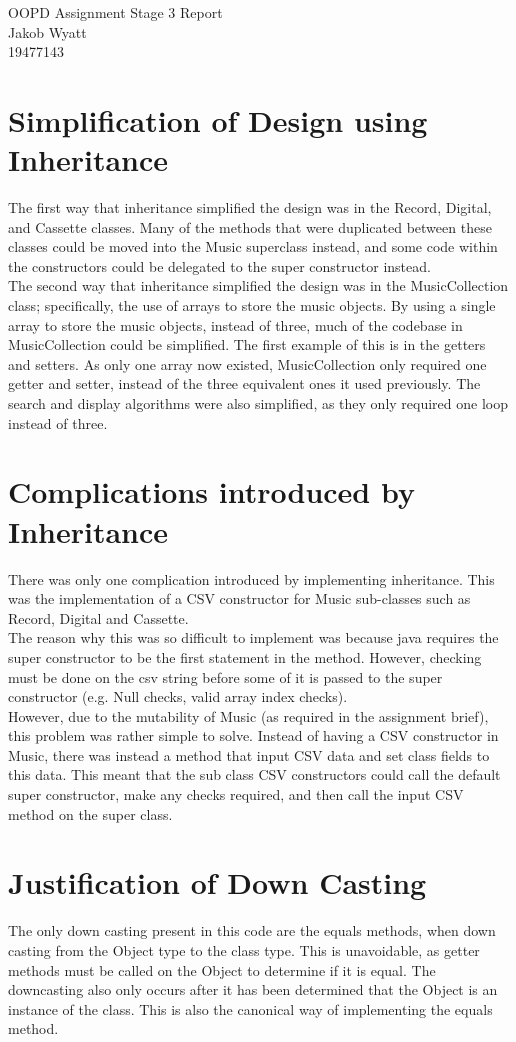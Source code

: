 \documentclass{article}
\begin{document}
\begin{center}
    \Huge
    OOPD Assignment Stage 3 Report\\
    \large
    Jakob Wyatt\\
    19477143
\end{center}

\section{Simplification of Design using Inheritance}
The first way that inheritance simplified the design was
in the Record, Digital, and Cassette classes. Many of the 
methods that were duplicated between these classes could be moved
into the Music superclass instead, and some code within the constructors
could be delegated to the super constructor instead.\\
The second way that inheritance simplified the design was in the 
MusicCollection class; specifically, the use of arrays to store the
music objects. By using a single array to store the music objects,
instead of three, much of the codebase in MusicCollection could be
simplified. The first example of this is in the getters and setters.
As only one array now existed, MusicCollection only required one 
getter and setter, instead of the three equivalent ones it used previously.
The search and display algorithms were also simplified, as they only required
one loop instead of three.

\section{Complications introduced by Inheritance}
There was only one complication introduced by implementing inheritance.
This was the implementation of a CSV constructor for Music sub-classes
such as Record, Digital and Cassette.\\
The reason why this was so difficult
to implement was because java requires the super constructor to be the first
statement in the method. However, checking must be done on the csv string
before some of it is passed to the super constructor
(e.g. Null checks, valid array index checks).\\
However, due to the mutability
of Music (as required in the assignment brief), this problem was rather
simple to solve. Instead of having a CSV constructor in Music, there was
instead a method that input CSV data and set class fields to this data.
This meant that the sub class CSV constructors could call the default
super constructor, make any checks required, and then call the input CSV
method on the super class.

\section{Justification of Down Casting}
The only down casting present in this code are the equals
methods, when down casting from the Object type to the class
type.
This is unavoidable, as getter methods must be called
on the Object to determine if it is equal. The downcasting also
only occurs after it has been determined that the Object
is an instance of the class. This is also the canonical way
of implementing the equals method.
\end{document}
